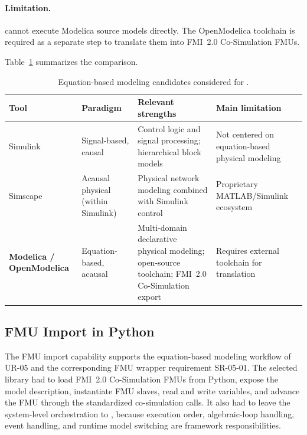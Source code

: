 \paragraph{Limitation.}
\syssimx{} cannot execute Modelica source models directly.
The OpenModelica toolchain is required as a separate step to translate them into \ac{FMI}~2.0 Co-Simulation \acp{FMU}.

Table~\ref{tab:eq_tool_comparison} summarizes the comparison.

\begin{table}[htbp]
  \centering
  \small
  \caption{Equation-based modeling candidates considered for \syssimx{}.}
  \label{tab:eq_tool_comparison}
  \begin{tabular}{p{2.5cm} p{3.0cm} p{4.5cm} p{4.0cm}}
    \toprule
    \textbf{Tool}                    & \textbf{Paradigm}                  & \textbf{Relevant strengths}                                                                     & \textbf{Main limitation}                         \\
    \midrule
    Simulink                         & Signal-based, causal               & Control logic and signal processing; hierarchical block models                                  & Not centered on equation-based physical modeling \\
    \addlinespace
    Simscape                         & Acausal physical (within Simulink) & Physical network modeling combined with Simulink control                                        & Proprietary MATLAB/Simulink ecosystem            \\
    \addlinespace
    \textbf{Modelica / OpenModelica} & Equation-based, acausal            & Multi-domain declarative physical modeling; open-source toolchain; \ac{FMI}~2.0 Co-Simulation export & Requires external toolchain for translation      \\
    \bottomrule
  \end{tabular}
\end{table}

\subsection{FMU Import in Python}
\label{sec:tool_fmpy}

The \ac{FMU} import capability supports the equation-based modeling workflow of UR-05 and the corresponding \ac{FMU} wrapper requirement SR-05-01.
The selected library had to load \ac{FMI}~2.0 Co-Simulation \acp{FMU} from Python, expose the model description, instantiate \ac{FMU} slaves, read and write variables, and advance the \ac{FMU} through the standardized co-simulation calls.
It also had to leave the system-level orchestration to \syssimx{}, because execution order, algebraic-loop handling, event handling, and runtime model switching are framework responsibilities.

